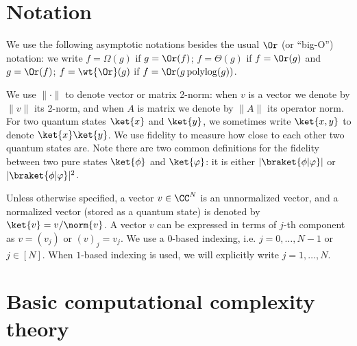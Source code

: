 \appendix
\chapter{Notation}


We use the following asymptotic notations besides the usual $\Or$ (or ``big-O'') notation: 
we write $f=\Omega(g)$ if $g=\Or(f)$; $f=\Theta(g)$ if $f=\Or(g)$ and $g=\Or(f)$; $f=\wt{\Or}(g)$ if $f=\Or(g\operatorname{polylog}(g))$. 


We use $\|\cdot\|$ to denote vector or matrix 2-norm: when $v$ is a vector we denote by $\|v\|$ its 2-norm, and when $A$ is matrix we denote by $\|A\|$ its operator norm. For two quantum states $\ket{x}$ and $\ket{y}$, we sometimes write $\ket{x,y}$ to denote $\ket{x}\ket{y}$. We use fidelity to measure how close to each other two quantum states are. Note there are two common definitions for the fidelity between two pure states $\ket{\phi}$ and $\ket{\varphi}$: it is either $|\braket{\phi|\varphi}|$ or $|\braket{\phi|\varphi}|^2$. 

Unless otherwise specified, a vector $v\in\CC^N$ is an unnormalized vector, and a normalized vector (stored as a quantum state) is denoted by $\ket{v}=v/\norm{v}$.
A vector $v$ can be expressed in terms of $j$-th component as $v=(v_j)$ or $(v)_j=v_j$. We use a $0$-based indexing, i.e. $j=0,\ldots,N-1$ or $j\in [N]$. When $1$-based indexing is used, we will explicitly write $j=1,\ldots,N$.

\chapter{Basic computational complexity theory}

